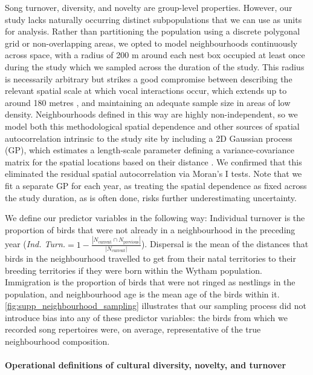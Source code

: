 \documentclass[9pt, twocolumn, twoside]{gsajnl}
\begin{document}
Song turnover, diversity, and novelty are group-level properties. However, our study lacks naturally occurring distinct subpopulations that we can use as units for analysis. Rather than partitioning the population using a discrete polygonal grid or non-overlapping areas, we opted to model neighbourhoods continuously across space, with a radius of 200 m around each nest box occupied at least once during the study \parencite{fayet2014} which we sampled across the duration of the study. This radius is necessarily arbitrary but strikes a good compromise between describing the relevant spatial scale at which vocal interactions occur, which extends up to around 180 metres \parencite{bircher2021, blumenrath2004}, and maintaining an adequate sample size in areas of low density. Neighbourhoods defined in this way are highly non-independent, so we model both this methodological spatial dependence and other sources of spatial autocorrelation intrinsic to the study site by including a 2D Gaussian process (GP), which estimates a length-scale parameter defining a variance-covariance matrix for the spatial locations based on their distance \parencite{dearmon2016, gelfand2016, wright2021}. We confirmed that this eliminated the residual spatial autocorrelation via Moran's I tests. Note that we fit a separate GP for each year, as treating the spatial dependence as fixed across the study duration, as is often done, risks further underestimating uncertainty. 

We define our predictor variables in the following way: Individual turnover is the proportion of birds that were not already in a neighbourhood in the preceding year (\textit{Ind. Turn.}$ = 1 - \frac{|N_{\text{current}} \cap N_{\text{previous}}|}{|N_{\text{current}}|}$). Dispersal is the mean of the distances that birds in the neighbourhood travelled to get from their natal territories to their breeding territories if they were born within the Wytham population. Immigration is the proportion of birds that were not ringed as nestlings in the population, and neighbourhood age is the mean age of the birds within it. \autoref{fig:supp_neighbourhood_sampling} illustrates that our sampling process did not introduce bias into any of these predictor variables: the birds from which we recorded song repertoires were, on average, representative of the true neighbourhood composition.

\paragraph{Operational definitions of cultural diversity, novelty, and turnover}
\end{document}
